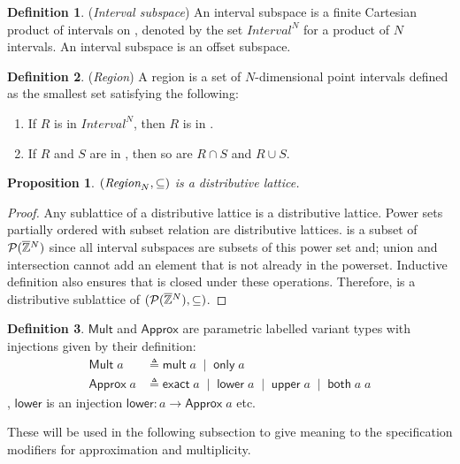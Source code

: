 \documentclass[acmlarge,review]{acmart}
\theoremstyle{definition}
\newtheorem{defn}{Definition}
\theoremstyle{plain}
\newtheorem{prop}{Proposition}
\theoremstyle{remark}
\begin{document}
\begin{defn}{(\emph{Interval subspace})}
  An interval subspace is a finite Cartesian product of intervals on \zinf{},
  denoted by the set $\textit{Interval}^N$ for a product of $N$ intervals. An
  interval subspace is an offset subspace.
\end{defn}

\begin{defn}{(\emph{Region})}
  A region  is a set of $N$-dimensional point intervals defined as
  the smallest set satisfying the following:
%
  \begin{enumerate}
    \item If $R$ is in $\textit{Interval}^N$, then $R$ is in .
    \item If $R$ and $S$ are in , then so are $R \cap S$ and
      $R \cup S$.
  \end{enumerate}
\end{defn}

\begin{prop}{}
  $(\textnormal{$\textit{Region}_{N}$},\subseteq)$ is a distributive lattice.
\end{prop}
%
\begin{proof}
  Any sublattice of a distributive lattice is a distributive lattice. Power sets
  partially ordered with subset relation are distributive lattices. 
  is a subset of $\mathcal{P}{(\textnormal{$\overline{\mathbb{Z}}$}{}^N)}$ since all interval subspaces are
  subsets of this power set and; union and intersection cannot add an element
  that is not already in the powerset. Inductive definition also ensures that
   is closed under these operations. Therefore,  is a
  distributive sublattice of $(\mathcal{P}{(\textnormal{$\overline{\mathbb{Z}}$}{}^N)}, \subseteq)$.
\end{proof}

\begin{defn}{}
  $\mathsf{Mult}$ and $\mathsf{Approx}$ are parametric labelled variant types
  with injections given by their definition:
%
  \begin{align*}
    \mathsf{Mult} \; a &
      \triangleq \mathsf{mult} \; a \;\mid\; \mathsf{only} \; a \\
    \mathsf{Approx} \; a &
      \triangleq \mathsf{exact} \; a \;\mid\; \mathsf{lower} \; a \;\mid\;
        \mathsf{upper} \; a \;\mid\; \mathsf{both} \; a \; a
  \end{align*}
%
  \eg{}, $\mathsf{lower}$ is an injection $\mathsf{lower} : a \to \mathsf{Approx}
  \; a$ etc.

  These will be used in the following subsection to give meaning to the
  specification modifiers for approximation and multiplicity.
\end{defn}
\end{document}
